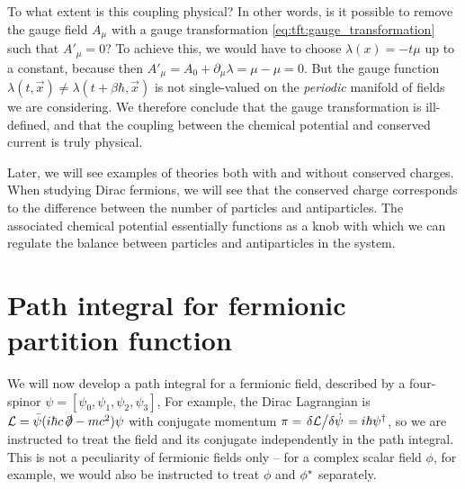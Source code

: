 To what extent is this coupling physical?
In other words, is it possible to remove the gauge field $A_\mu$ with a gauge transformation \eqref{eq:tft:gauge_transformation} such that $A'_\mu = 0$?
To achieve this, we would have to choose $\lambda(x) = -t \mu$ up to a constant, because then $A'_\mu = A_0 + \partial_\mu \lambda = \mu - \mu = 0$.
But the gauge function $\lambda(t, \vec{x}) \neq \lambda(t + \beta \hbar, \vec{x})$ is not single-valued on the \emph{periodic} manifold of fields we are considering.
We therefore conclude that the gauge transformation is ill-defined, and that the coupling between the chemical potential and conserved current is truly physical.

Later, we will see examples of theories both with and without conserved charges.
When studying Dirac fermions, we will see that the conserved charge corresponds to the difference between the number of particles and antiparticles.
The associated chemical potential essentially functions as a knob with which we can regulate the balance between particles and antiparticles in the system.




\section{Path integral for fermionic partition function}

\newcommand\creat{\hat\psi^\dagger}
\newcommand\destr{\hat\psi        }

We will now develop a path integral for a fermionic field, described by a four-spinor $\psi = [ \psi_0, \psi_1, \psi_2, \psi_3 ]$,
For example, the Dirac Lagrangian is $\mathcal{L} = \bar{\psi} (i \hbar c \, \slashed\partial - m c^2) \psi$ with conjugate momentum $\pi = \fdv{\lagr}/{\dot\psi} = i \hbar \psi^\dagger$, so we are instructed to treat the field and its conjugate independently in the path integral.
This is not a peculiarity of fermionic fields only -- for a complex scalar field $\phi$, for example, we would also be instructed to treat $\phi$ and ${\phi}^*$ separately. 

